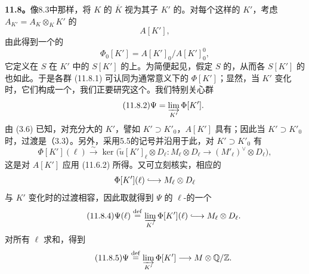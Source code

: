 \textbf{11.8。}像8.3中那样，将 $K$ 的 $\overline K$ 视为其子 $K'$ 的。对每个这样的 $K'$，考虑 $A_{K'}=A_K\otimes_KK'$ 的
\[
 A[K'],
\]
由此得到一个的
\begin{equation}\tag{11.8.1}
 \Phi_0[K']=A[K']_0/A[K']_0^0,
\end{equation}
它定义在 $S$ 在 $K'$ 中的 $S[K']$ 的上。为简便起见，假定 $S$ 的，从而各 $S[K']$ 的也如此。于是各群 (11.8.1) 可认同为通常意义下的 $\Phi[K']$；显然，当 $K'$ 变化时，它们构成一个，我们正要研究这个。我们特别关心群
\begin{equation}\tag{11.8.2}
 \Psi=\varinjlim_{K'}\Phi[K'].
\end{equation}
由 (3.6) 已知，对充分大的 $K'$，譬如 $K'\supset K'_0$，$A[K']$ 具有；因此当 $K'\supset K'_0$ 时，过渡是（3.3）。另外，采用5.5的记号并沿用于此，对 $K'\supset K'_0$ 有
\begin{equation}\tag{11.8.3}
 \Phi[K'](\ell)\xrightarrow{\sim}
 \ker\bigl(\widetilde u[K']_\ell\otimes D_\ell:
 M_\ell\otimes D_\ell\longrightarrow(M'_\ell)^\vee\otimes D_\ell\bigr),
\end{equation}
这是对 $A[K']$ 应用 (11.6.2) 所得。又可立刻核实，相应的
\[
 \Phi[K'](\ell)\lhook\joinrel\longrightarrow M_\ell\otimes D_\ell
\]
与 $K'$ 变化时的过渡相容，因此取就得到 $\Psi$ 的 $\ell$-的一个
\begin{equation}\tag{11.8.4}
 \Psi(\ell)\mathrel{\mathop=^{\mathrm{def}}}
 \varinjlim_{K'}\Phi[K'](\ell)\lhook\joinrel\longrightarrow M_\ell\otimes D_\ell.
\end{equation}
对所有 $\ell$ 求和，得到
\begin{equation}\tag{11.8.5}
 \Psi\mathrel{\mathop=^{\mathrm{def}}}\varinjlim_{K'}\Phi[K']
 \longrightarrow M\otimes\mathbb Q/\mathbb Z.
\end{equation}

